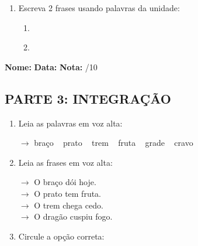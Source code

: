 \begin{exercicio}
\begin{enumerate}[resume]
  \item Escreva 2 frases usando palavras da unidade:
  \begin{enumerate}[label=\alph*)]
    \item \underline{\hspace{8cm}}
    \item \underline{\hspace{8cm}}
  \end{enumerate}

\end{enumerate}

\end{exercicio}



\begin{exercicio}

\noindent\textbf{Nome:} \underline{\hspace{3.2cm}} \quad \textbf{Data:} \underline{\hspace{1.6cm}} \quad \textbf{Nota:} \underline{\hspace{0.9cm}}/10


\subsection*{PARTE 3: INTEGRAÇÃO}

\begin{enumerate}[resume]

  \item Leia as palavras em voz alta:
  \begin{center}
  $\rightarrow$ braço ~ prato ~ trem ~ fruta ~ grade ~ cravo
  \end{center}

  \item Leia as frases em voz alta:
  \begin{center}
  $\rightarrow$ O braço dói hoje.\\
  $\rightarrow$ O prato tem fruta.\\
  $\rightarrow$ O trem chega cedo.\\
  $\rightarrow$ O dragão cuspiu fogo.\\
  \end{center}

  \item Circule a opção correta:
  \begin{enumerate}[label=(\alph*)]


\end{enumerate}
\end{enumerate}
\end{exercicio}
